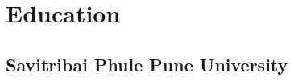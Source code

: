 \documentclass[]{deedy-resume-openfont}
\begin{document}
\begin{minipage}[t]{0.66\textwidth}

\section{Education} 

\subsection{Savitribai Phule Pune University}
\sectionsep
{} 
\sectionsep




%
%

\end{minipage} 
\hfill
\end{document}
